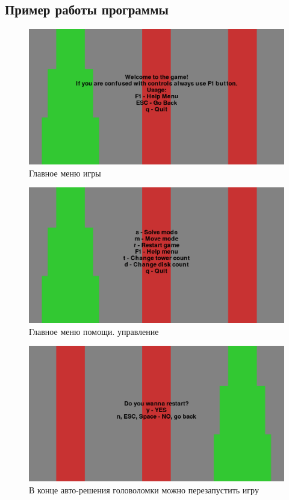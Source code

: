 \subsection{Пример работы программы}

\begin{figure}[H]
	\begin{center}
		\includegraphics[width=\textwidth]{images/main_menu.png}
		\caption{Главное меню игры}
	\end{center}
\end{figure}
\begin{figure}[H]
	\begin{center}
		\includegraphics[width=\textwidth]{images/main_help.png}
		\caption{Главное меню помощи. управление}
	\end{center}
\end{figure}
\begin{figure}[H]
	\begin{center}
		\includegraphics[width=\textwidth]{images/finish.png}
		\caption{В конце авто-решения головоломки можно перезапустить игру}
	\end{center}
\end{figure}
